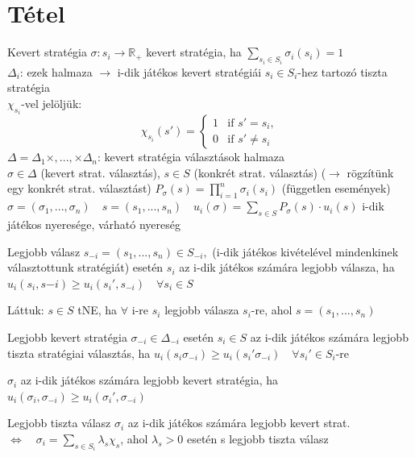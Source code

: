 \newpage
\section{Tétel}
\begin{definition}{Kevert stratégia}{}
	$\sigma : s_i \rightarrow \mathbb{R}_+$ kevert stratégia, ha $\sum_{s_i \in S_i} \sigma_i(s_i) = 1$ \\
	$\Delta_i$: ezek halmaza $\rightarrow$ i-dik játékos kevert stratégiái 
	$s_i \in S_i$-hez tartozó tiszta stratégia \\
	$\chi_{s_i}$-vel jelöljük: 
	\[
	\chi_{s_i}(s') =
	\begin{cases}
		1 & \text{if } s' = s_i, \\
		0 & \text{if } s' \neq s_i
	\end{cases}
	\] 
	$\Delta = \Delta_1 \times , ..., \times \Delta_n$: kevert stratégia választások halmaza \\
	$\sigma \in \Delta$ (kevert strat. választás), \quad $s \in S$ (konkrét strat. választás) ($\rightarrow$ rögzítünk egy konkrét strat. választást) $P_\sigma (s) = \prod_{i=1}^n \sigma_i(s_i) $ (független események)\\
	$\sigma = (\sigma_1, ..., \sigma_n) \quad s=(s_1, ..., s_n) \quad u_i(\sigma) = \sum_{s \in S} P_\sigma (s) \cdot u_i(s)$ i-dik  játékos nyeresége, várható nyereség
\end{definition}

\begin{definition}{Legjobb válasz}{}
	$s_{-i} = (s_1, ..., s_n) \in S_{-i},$ (i-dik játékos kivételével mindenkinek választottunk stratégiát) esetén $s_i$ az i-dik játékos számára legjobb válasza, ha $u_i(s_i,s{-i}) \geq u_i(s_i',s_{-i}) \quad \forall s_i \in S$
\end{definition}

Láttuk: $s \in S$ tNE, ha $\forall$ i-re $s_i$ legjobb válasza $s_i$-re, ahol $s = (s_1, ..., s_n)$

\begin{definition}{Legjobb kevert stratégia}{}
	$\sigma_{-i} \in \Delta_{-i}$ esetén $s_i \in S$ az i-dik játékos számára legjobb tiszta stratégiai választás, ha $u_i(s_i \sigma_{-i}) \geq u_i(s_i'\sigma_{-i}) \quad \forall s_i' \in S_i$-re
\end{definition}

$\sigma_i$ az i-dik játékos számára legjobb kevert stratégia, ha $u_i(\sigma_i, \sigma_{-i}) \geq u_i(\sigma_i', \sigma_{-i})$

\begin{observation}{Legjobb tiszta válasz}{}
	$\sigma_i$ az i-dik játékos számára legjobb kevert strat. $\Leftrightarrow \quad \sigma_i = \sum_{s \in S_i} \lambda_s \chi_s$, ahol $\lambda_s > 0$ esetén s legjobb tiszta válasz
\end{observation}

